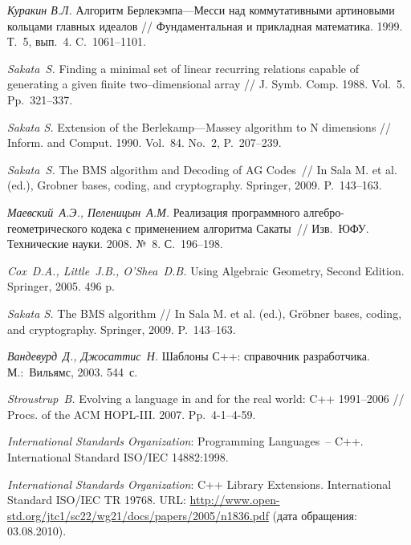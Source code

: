 \documentclass[14pt]{extarticle}
\newcommand{\nspace}{\hspace{0pt}}
\newcommand{\nbdash}{\nobreakdash-\nspace}
\begin{document}
\begin{thebibliography}{99}
     \emph{Куракин В.Л.} Алгоритм Берлекэмпа—Месси над
    коммутативными артиновыми кольцами главных идеалов // Фундаментальная и
    прикладная математика. 1999. Т.~5, вып.~4. C.~1061–1101.

     \emph{Sakata~S.} Finding a minimal set of linear recurring
    relations capable of generating a given finite two–dimensional array // J.
    Symb. Comp. 1988. Vol.~5. Pp.~321–337.

     \emph{Sakata S.} Extension of the Berlekamp—Massey
    algorithm to N dimensions // Inform. and Comput. 1990. Vol.~84. No.~2,
    P.~207–239.

     \emph{Sakata~S.} The BMS algorithm and Decoding of AG
    Codes~// In Sala M. et al. (ed.), Gr\:obner bases, coding, and cryptography.
    Springer, 2009. P.~143–163.

     \emph{Маевский~А.Э., Пеленицын~А.М.} Реализация
    программного алгебро\nbdash{}геометрического кодека с
    применением алгоритма Сакаты~// Изв.~ЮФУ. Технические науки. 2008. №~8. С.~196–198.
    
     \emph{Cox~D.A., Little~J.B., O'Shea~D.B.} Using Algebraic
    Geometry, Second Edition. Springer, 2005. 496 p.
    
     \emph{Sakata S.} The BMS algorithm // In Sala M.
    et al. (ed.), Gr\"obner bases, coding, and cryptography. Springer, 2009.
    P.~143–163.
    
    \emph{Вандевурд~Д., Джосаттис~Н.} Шаблоны С++: справочник
    разработчика. М.:~Вильямс, 2003. 544~с.
    
    \emph{Stroustrup~B.} Evolving a language in and for
    the real world: C++ 1991–2006 // Procs. of the ACM HOPL-III. 2007.
    Pp.~4-1–4-59.
    
    
     \emph{International Standards Organization}: Programming
    Languages~– C++. International Standard ISO/IEC 14882:1998.

     \emph{International Standards Organization}: C++ Library
    Extensions. International Standard ISO/IEC TR 19768.
    URL: \url{http://www.open-std.org/jtc1/sc22/wg21/docs/papers/2005/n1836.pdf}
    (дата обращения: 03.08.2010).
    

\end{thebibliography}
\end{document}
